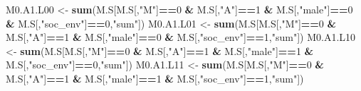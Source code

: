 \documentclass[
]{book}
\newenvironment{Shaded}{\begin{snugshade}}{\end{snugshade}}
\newcommand{\DecValTok}[1]{\textcolor[rgb]{0.00,0.00,0.81}{#1}}
\newcommand{\FunctionTok}[1]{\textcolor[rgb]{0.13,0.29,0.53}{\textbf{#1}}}
\newcommand{\NormalTok}[1]{#1}
\newcommand{\OtherTok}[1]{\textcolor[rgb]{0.56,0.35,0.01}{#1}}
\newcommand{\SpecialCharTok}[1]{\textcolor[rgb]{0.81,0.36,0.00}{\textbf{#1}}}
\newcommand{\StringTok}[1]{\textcolor[rgb]{0.31,0.60,0.02}{#1}}
\begin{document}
\begin{Shaded}
\begin{Highlighting}[]
\NormalTok{  M0.A1.L00 }\OtherTok{\textless{}{-}} \FunctionTok{sum}\NormalTok{(M.S[M.S[,}\StringTok{"M"}\NormalTok{]}\SpecialCharTok{==}\DecValTok{0} \SpecialCharTok{\&}\NormalTok{ M.S[,}\StringTok{"A"}\NormalTok{]}\SpecialCharTok{==}\DecValTok{1} \SpecialCharTok{\&}\NormalTok{ M.S[,}\StringTok{"male"}\NormalTok{]}\SpecialCharTok{==}\DecValTok{0} \SpecialCharTok{\&} 
\NormalTok{                         M.S[,}\StringTok{"soc\_env"}\NormalTok{]}\SpecialCharTok{==}\DecValTok{0}\NormalTok{,}\StringTok{"sum"}\NormalTok{])}
\NormalTok{  M0.A1.L01 }\OtherTok{\textless{}{-}} \FunctionTok{sum}\NormalTok{(M.S[M.S[,}\StringTok{"M"}\NormalTok{]}\SpecialCharTok{==}\DecValTok{0} \SpecialCharTok{\&}\NormalTok{ M.S[,}\StringTok{"A"}\NormalTok{]}\SpecialCharTok{==}\DecValTok{1} \SpecialCharTok{\&}\NormalTok{ M.S[,}\StringTok{"male"}\NormalTok{]}\SpecialCharTok{==}\DecValTok{0} \SpecialCharTok{\&} 
\NormalTok{                         M.S[,}\StringTok{"soc\_env"}\NormalTok{]}\SpecialCharTok{==}\DecValTok{1}\NormalTok{,}\StringTok{"sum"}\NormalTok{])}
\NormalTok{  M0.A1.L10 }\OtherTok{\textless{}{-}} \FunctionTok{sum}\NormalTok{(M.S[M.S[,}\StringTok{"M"}\NormalTok{]}\SpecialCharTok{==}\DecValTok{0} \SpecialCharTok{\&}\NormalTok{ M.S[,}\StringTok{"A"}\NormalTok{]}\SpecialCharTok{==}\DecValTok{1} \SpecialCharTok{\&}\NormalTok{ M.S[,}\StringTok{"male"}\NormalTok{]}\SpecialCharTok{==}\DecValTok{1} \SpecialCharTok{\&} 
\NormalTok{                         M.S[,}\StringTok{"soc\_env"}\NormalTok{]}\SpecialCharTok{==}\DecValTok{0}\NormalTok{,}\StringTok{"sum"}\NormalTok{])}
\NormalTok{  M0.A1.L11 }\OtherTok{\textless{}{-}} \FunctionTok{sum}\NormalTok{(M.S[M.S[,}\StringTok{"M"}\NormalTok{]}\SpecialCharTok{==}\DecValTok{0} \SpecialCharTok{\&}\NormalTok{ M.S[,}\StringTok{"A"}\NormalTok{]}\SpecialCharTok{==}\DecValTok{1} \SpecialCharTok{\&}\NormalTok{ M.S[,}\StringTok{"male"}\NormalTok{]}\SpecialCharTok{==}\DecValTok{1} \SpecialCharTok{\&} 
\NormalTok{                         M.S[,}\StringTok{"soc\_env"}\NormalTok{]}\SpecialCharTok{==}\DecValTok{1}\NormalTok{,}\StringTok{"sum"}\NormalTok{])}
  

\end{Highlighting}
\end{Shaded}
\end{document}
